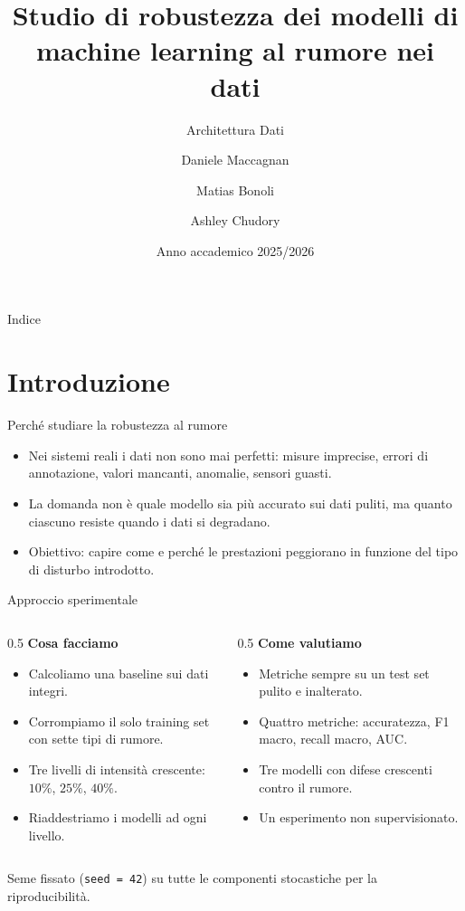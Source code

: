 \documentclass[aspectratio=169,11pt]{beamer}
\title[Robustezza al rumore]{Studio di robustezza dei modelli di machine learning al rumore nei dati}
\subtitle{Architettura Dati}
\author[Maccagnan, Bonoli, Chudory]{Daniele Maccagnan \and Matias Bonoli \and Ashley Chudory}
\date{Anno accademico 2025/2026}
\begin{document}
\begin{frame}[plain]
  \titlepage
\end{frame}

\begin{frame}{Indice}
  \tableofcontents
\end{frame}

\section{Introduzione}
\begin{frame}{Perché studiare la robustezza al rumore}
  \begin{itemize}
    \item Nei sistemi reali i dati non sono mai perfetti: misure
          imprecise, errori di annotazione, valori mancanti, anomalie, sensori
          guasti.
    \item La domanda non è quale modello sia più accurato sui dati puliti,
          ma quanto ciascuno resiste quando i dati si degradano.
    \item Obiettivo: capire come e perché le prestazioni
          peggiorano in funzione del tipo di disturbo introdotto.
  \end{itemize}
\end{frame}

\begin{frame}{Approccio sperimentale}
  \begin{columns}[t]
    \begin{column}{0.5\textwidth}
      \textbf{Cosa facciamo}
      \begin{itemize}
        \item Calcoliamo una baseline sui dati integri.
        \item Corrompiamo il solo training set con sette tipi di rumore.
        \item Tre livelli di intensità crescente: $10\%$, $25\%$, $40\%$.
        \item Riaddestriamo i modelli ad ogni livello.
      \end{itemize}
    \end{column}
    \begin{column}{0.5\textwidth}
      \textbf{Come valutiamo}
      \begin{itemize}
        \item Metriche sempre su un test set pulito e inalterato.
        \item Quattro metriche: accuratezza, F1 macro, recall macro, AUC.
        \item Tre modelli con difese crescenti contro il rumore.
        \item Un esperimento non supervisionato.
      \end{itemize}
    \end{column}
  \end{columns}
  \vfill
  Seme fissato (\texttt{seed = 42}) su tutte le componenti stocastiche per la riproducibilità.
\end{frame}
\end{document}

